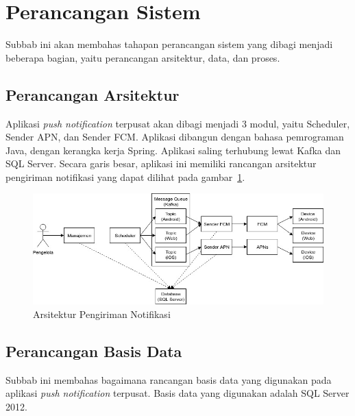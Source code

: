 \section{Perancangan Sistem}
\par Subbab ini akan membahas tahapan perancangan sistem yang dibagi menjadi beberapa bagian, yaitu perancangan
arsitektur, data, dan proses.

\subsection{Perancangan Arsitektur}
\par Aplikasi \textit{push notification} terpusat akan dibagi menjadi 3 modul, yaitu Scheduler,
Sender APN, dan Sender FCM.
Aplikasi dibangun dengan bahasa pemrograman Java, dengan kerangka kerja
Spring.
Aplikasi saling terhubung lewat Kafka dan SQL Server.
Secara garis besar, aplikasi ini memiliki rancangan
arsitektur pengiriman notifikasi yang dapat dilihat pada gambar~\ref{arsitektur_pengiriman_notifikasi}.
\begin{figure}[H]
    \centering\includegraphics[width=1\textwidth]{bab3/figures/arsitektur_pengiriman_notifikasi.jpg}
    \caption{Arsitektur Pengiriman Notifikasi}
    \label{arsitektur_pengiriman_notifikasi}
\end{figure}

\subsection{Perancangan Basis Data}
\par Subbab ini membahas bagaimana rancangan basis data yang digunakan pada aplikasi \textit{push notification} terpusat. Basis data yang digunakan adalah SQL Server 2012.

